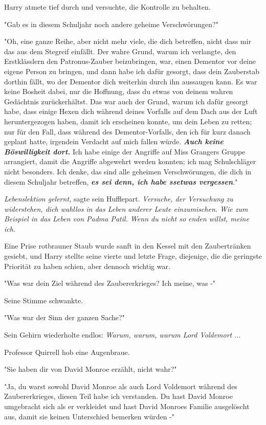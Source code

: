 {Harry atmete tief durch und versuchte, die Kontrolle zu behalten.

"Gab es in diesem Schuljahr noch andere geheime Verschwörungen?"

"Oh, eine ganze Reihe, aber nicht mehr viele, die dich betreffen, nicht dass mir das aus dem Stegreif einfällt. Der wahre Grund, warum ich verlangte, den Erstklässlern den Patronus-Zauber beizubringen, war, einen Dementor vor deine eigene Person zu bringen, und dann habe ich dafür gesorgt, dass dein Zauberstab dorthin fällt, wo der Dementor dich weiterhin durch ihn aussaugen kann. Es war keine Bosheit dabei, nur die Hoffnung, dass du etwas von deinem wahren Gedächtnis zurückerhältst. Das war auch der Grund, warum ich dafür gesorgt habe, dass einige Hexen dich während deines Vorfalls auf dem Dach aus der Luft heruntergezogen haben, damit ich erscheinen konnte, um dein Leben zu retten; nur für den Fall, dass während des Dementor-Vorfalls, den ich für kurz danach geplant hatte, irgendein Verdacht auf mich fallen würde. \textbf{\emph{Auch keine Böswilligkeit dort.}} Ich habe einige der Angriffe auf Miss Grangers Gruppe arrangiert, damit die Angriffe abgewehrt werden konnten; ich mag Schulschläger nicht besonders. Ich denke, das sind alle geheimen Verschwörungen, die dich in diesem Schuljahr betreffen, \textbf{\emph{es sei denn, ich habe ssetwas vergessen}}."

\emph{Lebenslektion gelernt,} sagte sein Hufflepart. \emph{Versuche, der Versuchung zu widerstehen, dich wahllos in das Leben anderer Leute einzumischen. Wie zum Beispiel in das Leben von Padma Patil. Wenn du nicht so enden willst, meine ich}.

Eine Prise rotbrauner Staub wurde sanft in den Kessel mit den Zaubertränken gesiebt, und Harry stellte seine vierte und letzte Frage, diejenige, die die geringste Priorität zu haben schien, aber dennoch wichtig war.

"Was war dein Ziel während des Zaubererkrieges? Ich meine, was -"

Seine Stimme schwankte.

"Was war der Sinn der ganzen Sache?"

Sein Gehirn wiederholte endlos: \emph{Warum, warum, warum Lord Voldemort .}..

Professor Quirrell hob eine Augenbraue.

"Sie haben dir von David Monroe erzählt, nicht wahr?"

"Ja, du warst sowohl David Monroe als auch Lord Voldemort während des Zaubererkrieges, diesen Teil habe ich verstanden. Du hast David Monroe umgebracht sich als er verkleidet und hast David Monroes Familie ausgelöscht aus, damit sie keinen Unterschied bemerken würden -"

}
